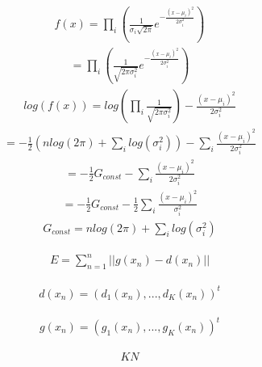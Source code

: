 \documentclass{article}
\begin{document}
\begin{align*}
f(x)=\prod_i\left(\frac{1}{\sigma_i\sqrt{2\pi}}e^{-\frac{(x-\mu_i)^2}{2\sigma_i^2}}\right)
\end{align*}
\begin{align*}
   =\prod_i\left(\frac{1}{\sqrt{2\pi\sigma_i^2}}e^{-\frac{(x-\mu_i)^2}{2\sigma_i^2}}\right)
\end{align*}
\begin{align*}
log\left(f(x)\right)  =log\left(\prod_i	\frac{1}{\sqrt{2\pi\sigma_i^2}}\right)-{\frac{(x-\mu_i)^2}{2\sigma_i^2}}
\end{align*}
\begin{align*}
      =-\frac{1}{2}\left(nlog(2\pi)+\sum_ilog(\sigma_i^2)\right)-{\sum_i\frac{(x-\mu_i)^2}{2\sigma_i^2}}
\end{align*}
\begin{align*}
      =-\frac{1}{2}G_{const}-{\sum_i\frac{(x-\mu_i)^2}{2\sigma_i^2}}
\end{align*}
\begin{align*}
      =-\frac{1}{2}G_{const}-{\frac{1}{2}\sum_i{\frac{(x-\mu_i)^2}{\sigma_i^2}}}
\end{align*}
\begin{align*}
G_{const} =nlog(2\pi)+\sum_ilog(\sigma_i^2)
\end{align*}

\begin{align*}
E=\sum_{n=1}^{n} \lvert \lvert {  g  \left( x_n \right)   -  d  \left( x_n \right)  } \rvert \rvert
\end{align*}

\begin{align*}
d  \left( x_n \right) = \left( {d_1 \left( x_n \right),...,d_K \left( x_n \right)}  \right)^t
\end{align*}


\begin{align*}
g  \left( x_n \right) = \left( {g_1 \left( x_n \right),...,g_K \left( x_n \right)}  \right)^t
\end{align*}


\begin{align*}
K       N
\end{align*}
\end{document}
